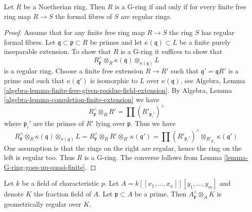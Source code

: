 \begin{lemma}
\label{lemma-check-G-ring}
Let $R$ be a Noetherian ring. Then $R$ is a G-ring if and only if
for every finite free ring map $R \to S$ the formal fibres of $S$
are regular rings.
\end{lemma}

\begin{proof}
Assume that for any finite free ring map $R \to S$ the ring $S$ has
regular formal fibres. Let $\mathfrak q \subset \mathfrak p \subset R$
be primes and let $\kappa(\mathfrak q) \subset L$ be a finite purely
inseparable extension. To show that $R$ is a G-ring it suffices to
show that
$$
R_\mathfrak p^\wedge \otimes_R \kappa(\mathfrak q)
\otimes_{\kappa(\mathfrak q)} L
$$
is a regular ring. Choose a finite free extension $R \to R'$ such that
$\mathfrak q' = \mathfrak qR'$ is a prime and such that $\kappa(\mathfrak q')$
is isomorphic to $L$ over $\kappa(\mathfrak q)$, see
Algebra, Lemma \ref{algebra-lemma-finite-free-given-residue-field-extension}.
By
Algebra, Lemma \ref{algebra-lemma-completion-finite-extension}
we have
$$
R_\mathfrak p^\wedge \otimes_R R' = \prod (R'_{\mathfrak p_i'})^\wedge
$$
where $\mathfrak p_i'$ are the primes of $R'$ lying over $\mathfrak p$.
Thus we have
$$
R_\mathfrak p^\wedge \otimes_R \kappa(\mathfrak q)
\otimes_{\kappa(\mathfrak q)} L =
R_\mathfrak p^\wedge \otimes_R R'
\otimes_{R'} \kappa(\mathfrak q')
=
\prod (R'_{\mathfrak p_i'})^\wedge
\otimes_{R'_{\mathfrak p'_i}} \kappa(\mathfrak q')
$$
Our assumption is that the rings on the right are regular, hence the
ring on the left is regular too. Thus $R$ is a G-ring. The converse
follows from Lemma \ref{lemma-G-ring-goes-up-quasi-finite}.
\end{proof}

\begin{lemma}
\label{lemma-helper-G-ring}
Let $k$ be a field of characteristic $p$.
Let $A = k[[x_1, \ldots, x_n]][y_1, \ldots, y_m]$ and denote $K$
the fraction field of $A$.
Let $\mathfrak p \subset A$ be a prime. Then
$A_\mathfrak p^\wedge \otimes_A K$ is geometrically regular over $K$.
\end{lemma}

